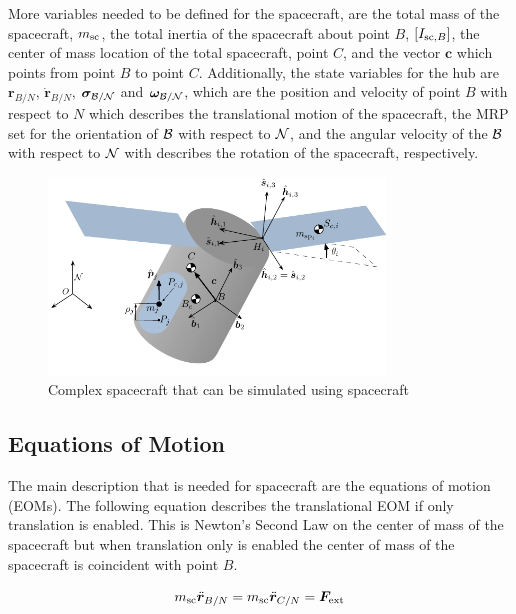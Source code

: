 More variables needed to be defined for the spacecraft, are the total mass of the spacecraft, $m_{\textnormal{sc}}$, the total inertia of the spacecraft about point $B$,  $[I_{\textnormal{sc},B}]$, the center of mass location of the total spacecraft, point $C$, and the vector $\bm c$ which points from point $B$ to point $C$. Additionally, the state variables for the hub are $\bm r_{B/N}$, $\dot{\bm r}_{B/N}$, $\bm \sigma_{\cal{B}/\cal{N}}$ and $\bm \omega_{\cal{B}/\cal{N}}$, which are the position and velocity of point $B$ with respect to $N$ which describes the translational motion of the spacecraft, the MRP set for the orientation of $\cal{B}$ with respect to $\cal{N}$, and the angular velocity of the $\cal{B}$ with respect to $\cal{N}$ with describes the rotation of the spacecraft, respectively.


\begin{figure}[htbp]
	\centerline{
		\includegraphics[width=0.8\textwidth]{Figures/Flex_Slosh_Figure}}
	\caption{Complex spacecraft that can be simulated using spacecraft}
	\label{fig:FlexSloshFigure}
\end{figure}

\subsection{Equations of Motion}

The main description that is needed for spacecraft are the equations of motion (EOMs). The following equation describes the translational EOM if only translation is enabled. This is Newton's Second Law on the center of mass of the spacecraft but when translation only is enabled the center of mass of the spacecraft is coincident with point $B$.

\begin{equation}
m_{\text{sc}} \ddot{\bm r}_{B/N} = m_{\text{sc}} \ddot{\bm r}_{C/N} =  \bm F_{\textnormal{ext}}
\label{eq:Rbddot3}
\end{equation}

